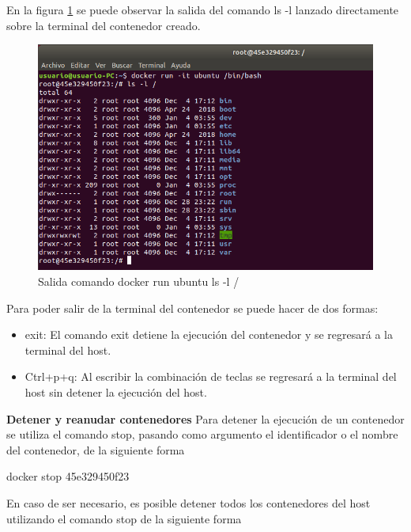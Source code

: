 En la figura \ref{fig:DockerGestion9} se puede observar la salida del comando ls -l lanzado directamente sobre la terminal del contenedor creado.

\begin{figure}[!hbtp]
	\centering
	\includegraphics[width=\linewidth]{RE05_Docker/Gestion_basica/REDocker_Gestion9.png}
	\vspace{-0.2cm}
	\caption{Salida comando docker run ubuntu ls -l /}
	\label{fig:DockerGestion9}
\end{figure}

Para poder salir de la terminal del contenedor se puede hacer de dos formas:
\begin{itemize}
    \item exit: El comando exit detiene la ejecución del contenedor y se regresará a la terminal del host.
    \item Ctrl+p+q: Al escribir la combinación de teclas se regresará a la terminal del host sin detener la ejecución del host.
\end{itemize}
\textbf{Detener y reanudar contenedores}
Para detener la ejecución de un contenedor se utiliza el comando stop, pasando como argumento el identificador o el nombre del contenedor, de la siguiente forma

\begin{commandshell} docker stop 45e329450f23 \end{commandshell}

En caso de ser necesario, es posible detener todos los contenedores del host utilizando el comando stop de la siguiente forma


